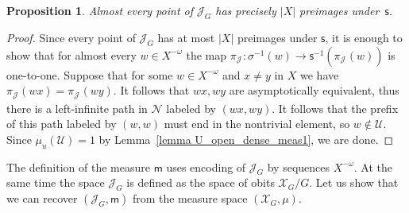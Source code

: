 \documentclass[12pt]{article}
\newcommand{\xmo}{X^{-\omega}}
\newcommand{\limGs}[1][G]{\mathcal{X}_{#1}}
\newcommand{\lims}[1][G]{\mathscr{J}_{#1}}
\newcommand{\si}{\mathsf{s}}
\newcommand{\muls}{\mathsf{m}}
\newcommand{\T}{\mathsf{T}}
\newcommand{\nucl}{\mathcal{N}}
\newtheorem{prop}[theor]{Proposition}
\theoremstyle{definition}
\begin{document}

\begin{prop}\label{prop_measure_prop_lims}
Almost every point of $\lims$ has precisely $|X|$ preimages under~$\si$.
\end{prop}
\begin{proof}
Since every point of $\lims$ has at most $|X|$ preimages under $\si$, it is enough to show that for
almost every $w\in\xmo$ the map $\pi_{\lims[]}:\sigma^{-1}(w)\rightarrow\si^{-1}(\pi_{\lims[]}(w))$
is one-to-one. Suppose that for some $w\in\xmo$ and $x\neq y$ in $X$ we have
$\pi_{\lims[]}(wx)=\pi_{\lims[]}(wy)$. It follows that $wx,wy$ are asymptotically equivalent, thus
there is a left-infinite path in $\nucl$ labeled by $(wx,wy)$. It follows that the prefix of this
path labeled by $(w,w)$ must end in the nontrivial element, so $w\not\in\mathcal{U}$. Since
$\mu_u(\mathcal{U})=1$ by Lemma~\ref{lemma U_open_dense_meas1}, we are done.
\end{proof}




The definition of the measure $\muls$ uses encoding of $\lims$ by sequences $\xmo$. At the same
time the space $\lims$ is defined as the space of obits $\limGs/G$. Let us show that we can recover
$(\lims,\muls)$ from the measure space $(\limGs,\mu)$.




\end{document}
